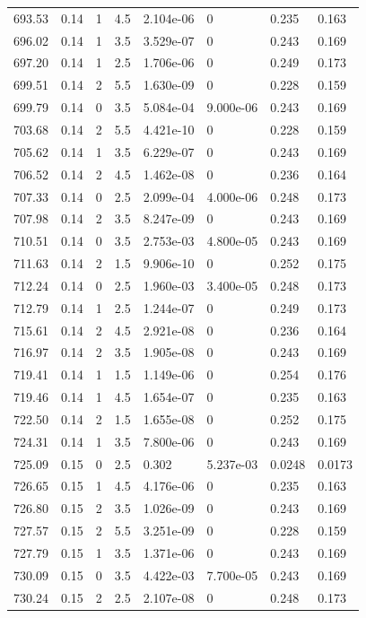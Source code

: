 \documentclass[preview]{standalone}
\begin{document}
{{{{{{{{{{{{\begin{tabular}{L{1.2cm}C{1.2cm} C{0.3cm}C{0.5cm} C{1.4cm}C{1.4cm} C{1.4cm}C{1.4cm}}
  693.53  &  0.14  & 1     & 4.5 &  2.104e-06  & 0  & 0.235 &  0.163   \\ 
  696.02  &  0.14  & 1     & 3.5 &  3.529e-07  & 0  & 0.243 &  0.169   \\ 
  697.20  &  0.14  & 1     & 2.5 &  1.706e-06  & 0  & 0.249 &  0.173   \\ 
  699.51  &  0.14  & 2     & 5.5 &  1.630e-09  & 0  & 0.228 &  0.159   \\ 
  699.79  &  0.14  & 0     & 3.5 &  5.084e-04  & 9.000e-06  & 0.243 &  0.169   \\ 
  703.68  &  0.14  & 2     & 5.5 &  4.421e-10  & 0  & 0.228 &  0.159   \\ 
  705.62  &  0.14  & 1     & 3.5 &  6.229e-07  & 0  & 0.243 &  0.169   \\ 
  706.52  &  0.14  & 2     & 4.5 &  1.462e-08  & 0  & 0.236 &  0.164   \\ 
  707.33  &  0.14  & 0     & 2.5 &  2.099e-04  & 4.000e-06  & 0.248 &  0.173   \\ 
  707.98  &  0.14  & 2     & 3.5 &  8.247e-09  & 0  & 0.243 &  0.169   \\ 
  710.51  &  0.14  & 0     & 3.5 &  2.753e-03  & 4.800e-05  & 0.243 &  0.169   \\ 
  711.63  &  0.14  & 2     & 1.5 &  9.906e-10  & 0  & 0.252 &  0.175   \\ 
  712.24  &  0.14  & 0     & 2.5 &  1.960e-03  & 3.400e-05  & 0.248 &  0.173   \\ 
  712.79  &  0.14  & 1     & 2.5 &  1.244e-07  & 0  & 0.249 &  0.173   \\ 
  715.61  &  0.14  & 2     & 4.5 &  2.921e-08  & 0  & 0.236 &  0.164   \\ 
  716.97  &  0.14  & 2     & 3.5 &  1.905e-08  & 0  & 0.243 &  0.169   \\ 
  719.41  &  0.14  & 1     & 1.5 &  1.149e-06  & 0  & 0.254 &  0.176   \\ 
  719.46  &  0.14  & 1     & 4.5 &  1.654e-07  & 0  & 0.235 &  0.163   \\ 
  722.50  &  0.14  & 2     & 1.5 &  1.655e-08  & 0  & 0.252 &  0.175   \\ 
  724.31  &  0.14  & 1     & 3.5 &  7.800e-06  & 0  & 0.243 &  0.169   \\ 
  725.09  &  0.15  & 0     & 2.5 &  0.302  & 5.237e-03  & 0.0248 &  0.0173   \\ 
  726.65  &  0.15  & 1     & 4.5 &  4.176e-06  & 0  & 0.235 &  0.163   \\ 
  726.80  &  0.15  & 2     & 3.5 &  1.026e-09  & 0  & 0.243 &  0.169   \\ 
  727.57  &  0.15  & 2     & 5.5 &  3.251e-09  & 0  & 0.228 &  0.159   \\ 
  727.79  &  0.15  & 1     & 3.5 &  1.371e-06  & 0  & 0.243 &  0.169   \\ 
  730.09  &  0.15  & 0     & 3.5 &  4.422e-03  & 7.700e-05  & 0.243 &  0.169   \\ 
  730.24  &  0.15  & 2     & 2.5 &  2.107e-08  & 0  & 0.248 &  0.173   \\ 
\hline 
\end{tabular} 

}}}}}}}}}}}}
\end{document}
